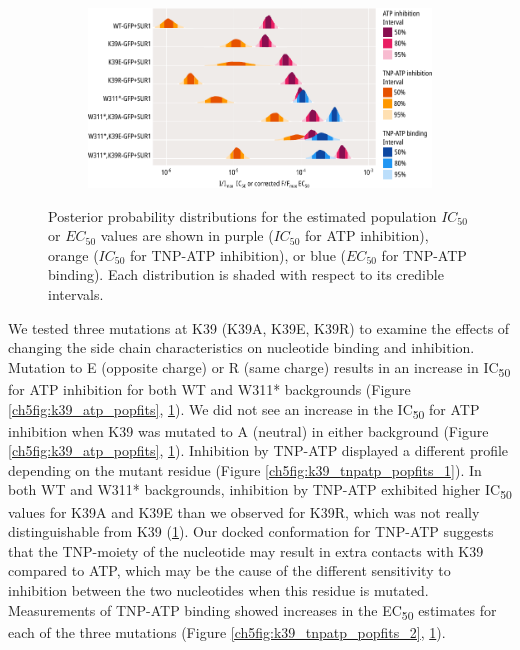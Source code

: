 \begin{figure}[h]
	\centering
	\begin{subfigure}[t]{0.9\textwidth}
		\caption{}\label{ch5fig:k39_ec50_fits}
		\centering
		\includegraphics[width=\textwidth]{k39_5.pdf}
	\end{subfigure}
	\caption[K39 mutations $EC_{50}$ parameters]{
	 Posterior probability distributions for the estimated population $IC_{50}$ or $EC_{50}$ values are shown in purple ($IC_{50}$ for ATP inhibition), orange ($IC_{50}$ for TNP-ATP inhibition), or blue ($EC_{50}$ for TNP-ATP binding).
	Each distribution is shaded with respect to its credible intervals.
	}\label{ch5fig:k39_1a}
\end{figure}

We tested three mutations at K39 (K39A, K39E, K39R) to examine the effects of changing the side chain characteristics on nucleotide binding and inhibition.
Mutation to E (opposite charge) or R (same charge) results in an increase in IC\textsubscript{50} for ATP inhibition for both WT and W311* backgrounds (Figure \ref{ch5fig:k39_atp_popfits}, \ref{ch5fig:k39_ec50_fits}).
We did not see an increase in the IC\textsubscript{50} for ATP inhibition when K39 was mutated to A (neutral) in either background (Figure \ref{ch5fig:k39_atp_popfits}, \ref{ch5fig:k39_ec50_fits}).
Inhibition by TNP-ATP displayed a different profile depending on the mutant residue (Figure \ref{ch5fig:k39_tnpatp_popfits_1}).
In both WT and W311* backgrounds, inhibition by TNP-ATP exhibited higher IC\textsubscript{50} values for K39A and K39E than we observed for K39R, which was not really distinguishable from K39 (\ref{ch5fig:k39_ec50_fits}).
Our docked conformation for TNP-ATP suggests that the TNP-moiety of the nucleotide may result in extra contacts with K39 compared to ATP, which may be the cause of the different sensitivity to inhibition between the two nucleotides when this residue is mutated.
Measurements of TNP-ATP binding showed increases in the EC\textsubscript{50} estimates for each of the three mutations (Figure \ref{ch5fig:k39_tnpatp_popfits_2}, \ref{ch5fig:k39_ec50_fits}).

